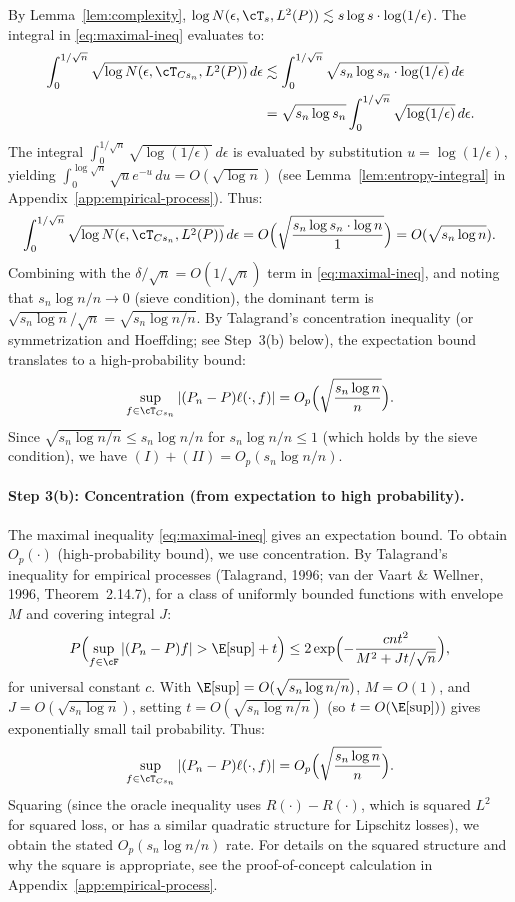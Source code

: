 By Lemma~\ref{lem:complexity}, $\log N(\epsilon, \cT_s, L^2(P)) \lesssim s \log s \cdot \log(1/\epsilon)$. The integral in \eqref{eq:maximal-ineq} evaluates to:
\begin{align*}
\int_0^{1/\sqrt{n}} \sqrt{\log N(\epsilon, \cT_{Cs_n}, L^2(P))} \, d\epsilon
&\lesssim \int_0^{1/\sqrt{n}} \sqrt{s_n \log s_n \cdot \log(1/\epsilon)} \, d\epsilon \\
&= \sqrt{s_n \log s_n} \int_0^{1/\sqrt{n}} \sqrt{\log(1/\epsilon)} \, d\epsilon.
\end{align*}
The integral $\int_0^{1/\sqrt{n}} \sqrt{\log(1/\epsilon)} \, d\epsilon$ is evaluated by substitution $u = \log(1/\epsilon)$, yielding $\int_0^{\log \sqrt{n}} \sqrt{u} e^{-u} \, du = O(\sqrt{\log n})$ (see Lemma~\ref{lem:entropy-integral} in Appendix~\ref{app:empirical-process}). Thus:
\[
\int_0^{1/\sqrt{n}} \sqrt{\log N(\epsilon, \cT_{Cs_n}, L^2(P))} \, d\epsilon = O\Bigl(\sqrt{\frac{s_n \log s_n \cdot \log n}{1}}\Bigr) = O(\sqrt{s_n \log n}).
\]
Combining with the $\delta/\sqrt{n} = O(1/\sqrt{n})$ term in \eqref{eq:maximal-ineq}, and noting that $s_n \log n / n \to 0$ (sieve condition), the dominant term is $\sqrt{s_n \log n} / \sqrt{n} = \sqrt{s_n \log n / n}$. By Talagrand's concentration inequality (or symmetrization and Hoeffding; see Step~3(b) below), the expectation bound translates to a high-probability bound:
\[
\sup_{f \in \cT_{Cs_n}} |(P_n - P) \ell(\cdot,f)| = O_p\Bigl(\sqrt{\frac{s_n \log n}{n}}\Bigr).
\]
Since $\sqrt{s_n \log n / n} \le s_n \log n / n$ for $s_n \log n / n \le 1$ (which holds by the sieve condition), we have $(I) + (II) = O_p(s_n \log n / n)$.

\paragraph{Step 3(b): Concentration (from expectation to high probability).}
The maximal inequality \eqref{eq:maximal-ineq} gives an expectation bound. To obtain $O_p(\cdot)$ (high-probability bound), we use concentration. By Talagrand's inequality for empirical processes (Talagrand, 1996; van der Vaart \& Wellner, 1996, Theorem~2.14.7), for a class of uniformly bounded functions with envelope $M$ and covering integral $J$:
\[
P\Bigl( \sup_{f \in \cF} |(P_n - P)f| > \E[\sup] + t \Bigr) \le 2 \exp\Bigl( - \frac{cnt^2}{M^2 + J t / \sqrt{n}} \Bigr),
\]
for universal constant $c$. With $\E[\sup] = O(\sqrt{s_n \log n / n})$, $M = O(1)$, and $J = O(\sqrt{s_n \log n})$, setting $t = O(\sqrt{s_n \log n / n})$ (so $t = O(\E[\sup])$) gives exponentially small tail probability. Thus:
\[
\sup_{f \in \cT_{Cs_n}} |(P_n - P) \ell(\cdot,f)| = O_p\Bigl(\sqrt{\frac{s_n \log n}{n}}\Bigr).
\]
Squaring (since the oracle inequality uses $R(\cdot) - R(\cdot)$, which is squared $L^2$ for squared loss, or has a similar quadratic structure for Lipschitz losses), we obtain the stated $O_p(s_n \log n / n)$ rate. For details on the squared structure and why the square is appropriate, see the proof-of-concept calculation in Appendix~\ref{app:empirical-process}.


